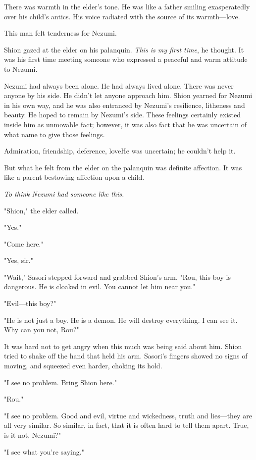 There was warmth in the elder's tone. He was like a father smiling
exasperatedly over his child's antics. His voice radiated with the
source of its warmth---love.

This man felt tenderness for Nezumi.

Shion gazed at the elder on his palanquin. \emph{This is my first time}, he
thought. It was his first time meeting someone who expressed a peaceful
and warm attitude to Nezumi.

Nezumi had always been alone. He had always lived alone. There was never
anyone by his side. He didn't let anyone approach him. Shion yearned for
Nezumi in his own way, and he was also entranced by Nezumi's resilience,
litheness and beauty. He hoped to remain by Nezumi's side. These
feelings certainly existed inside him as unmovable fact; however, it was
also fact that he was uncertain of what name to give those feelings.

Admiration, friendship, deference, love\el He was uncertain; he
couldn't help it.

But what he felt from the elder on the palanquin was definite affection.
It was like a parent bestowing affection upon a child.

\emph{To think Nezumi had someone like this.}

"Shion," the elder called.

"Yes."

"Come here."

"Yes, sir."

"Wait," Sasori stepped forward and grabbed Shion's arm. "Rou, this boy
is dangerous. He is cloaked in evil. You cannot let him near you."

"Evil---this boy?"

"He is not just a boy. He is a demon. He will destroy everything. I can
see it. Why can you not, Rou?"

It was hard not to get angry when this much was being said about him.
Shion tried to shake off the hand that held his arm. Sasori's fingers
showed no signs of moving, and squeezed even harder, choking its hold.

"I see no problem. Bring Shion here."

"Rou."

"I see no problem. Good and evil, virtue and wickedness, truth and
lies---they are all very similar. So similar, in fact, that it is often
hard to tell them apart. True, is it not, Nezumi?"

"I see what you're saying."

